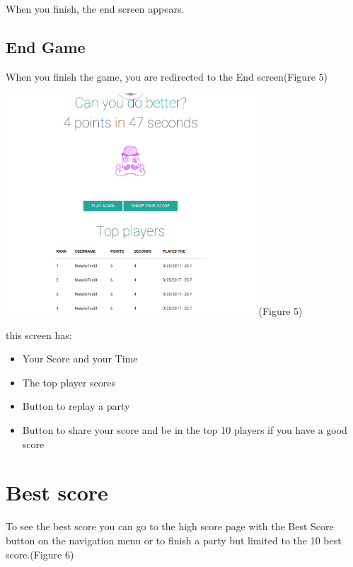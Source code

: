 \documentclass[a4paper,11pt, oneside]{book}
\begin{document}
When you finish, the end screen appears.

\subsection{End Game}
	When you finish the game, you are redirected to the End screen(Figure 5)

\begin{center}
	\includegraphics[width=0.7\textwidth]{CEnd.png}
	(Figure 5)
\end{center}

this screen has:
\begin{itemize}
\item Your Score and your Time
\item The top player scores
\item Button to replay a party
\item Button to share your score and be in the top 10 players if you have a good score
\end{itemize}

\section{Best score}
To see the best score you can go to the high score page with the Best Score button on the navigation menu or to finish a party but limited to the 10 best score.(Figure 6)
\end{document}
